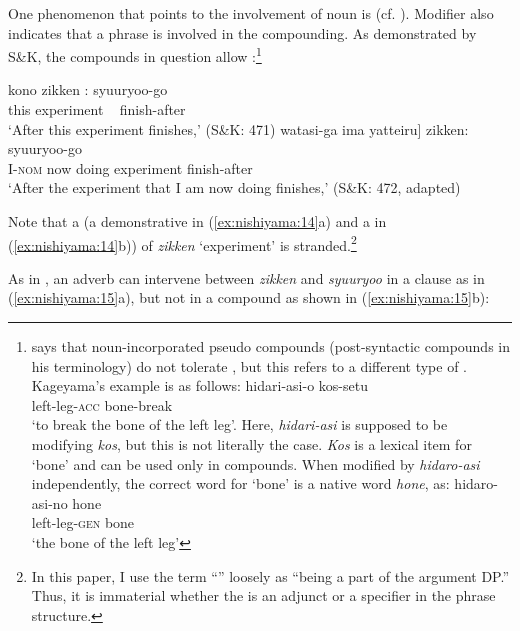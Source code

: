 \documentclass[output=paper]{LSP/langsci}
\begin{document}
One phenomenon that points to the involvement of noun  is   (cf. \citealt{Baker1988}). Modifier  also indicates that a phrase is involved in the compounding. As demonstrated by S\&K, the compounds in question allow  :\footnote{\citet[525]{Kageyama2009} says that noun-incorporated pseudo compounds (post-syntactic compounds in his terminology) do not tolerate  , but this refers to a different type of  . Kageyama’s example is as follows:  
\ea\label{ex:nishiyama:exfn1}
\ea
\gll hidari-asi-o kos-setu \\
left-leg-\textsc{acc} bone-break\\
\glt ‘to break the bone of the left leg’. 
\z \z
Here, \textit{hidari-asi} is supposed to be modifying \textit{kos}, but this is not literally the case. \textit{Kos} is a  lexical item for ‘bone’ and can be used only in  compounds. When modified by \textit{hidaro-asi} independently, the correct word for ‘bone’ is a native word \textit{hone}, as:  
\ea\label{ex:nishiyama:exfn2}
\ea
\gll hidaro-asi-no hone\\
left-leg-\textsc{gen} bone\\
\glt ‘the bone of the left leg’
\z \z}


\ea\label{ex:nishiyama:14}
\ea
 \gll kono zikken :  syuuryoo-go\\
    this experiment ~ finish-after\\
\glt ‘After this experiment finishes,’      (S\&K: 471)
  \ex
  \gll {\ob}watasi-ga ima yatteiru] zikken:  syuuryoo-go\\
      I-\textsc{nom} now  doing experiment finish-after\\
\glt ‘After the experiment that I am now doing finishes,’  (S\&K: 472, adapted)
\z \z

Note that a  (a demonstrative in (\ref{ex:nishiyama:14}a) and a  in (\ref{ex:nishiyama:14}b)) of \textit{zikken} ‘experiment’ is stranded.\footnote{In this paper, I use the term “” loosely as “being a part of the argument DP.” Thus, it is immaterial whether the  is an adjunct or a specifier in the phrase structure.}

  As in , an adverb can intervene between \textit{zikken} and \textit{syuuryoo} in a clause as in (\ref{ex:nishiyama:15}a), but not in a compound as shown in (\ref{ex:nishiyama:15}b):
\end{document}
